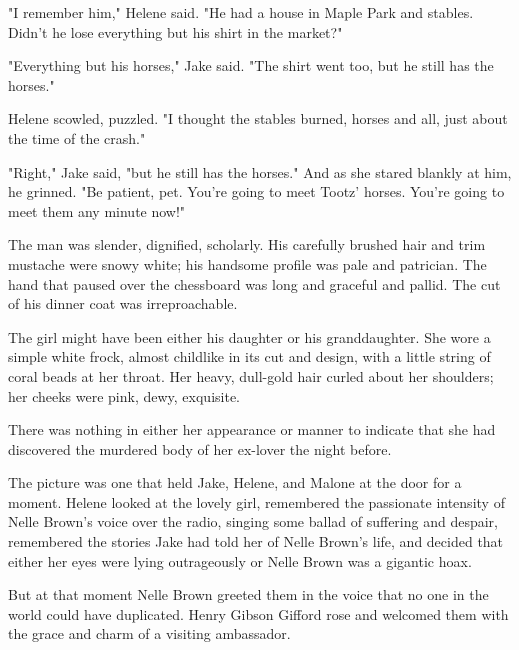 \documentclass{novel}
\begin{document}
"I remember him," Helene said. "He had a house in Maple Park and stables. Didn’t he lose everything but his shirt in the market?"

"Everything but his horses," Jake said. "The shirt went too, but he still has the horses."

Helene scowled, puzzled. "I thought the stables burned, horses and all, just about the time of the crash."

"Right," Jake said, "but he still has the horses." And as she stared blankly at him, he grinned. "Be patient, pet. You’re going to meet Tootz’ horses. You’re going to meet them any minute now!"

\begin{ChapterStart}
\vspace{3\nbs}
\end{ChapterStart}

The man was slender, dignified, scholarly. His carefully brushed hair and trim mustache were snowy white; his handsome profile was pale and patrician. The hand that paused over the chessboard was long and graceful and pallid. The cut of his dinner coat was irreproachable.

The girl might have been either his daughter or his granddaughter. She wore a simple white frock, almost childlike in its cut and design, with a little string of coral beads at her throat. Her heavy, dull-gold hair curled about her shoulders; her cheeks were pink, dewy, exquisite.

There was nothing in either her appearance or manner to indicate that she had discovered the murdered body of her ex-lover the night before.

The picture was one that held Jake, Helene, and Malone at the door for a moment. Helene looked at the lovely girl, remembered the passionate intensity of Nelle Brown’s voice over the radio, singing some ballad of suffering and despair, remembered the stories Jake had told her of Nelle Brown’s life, and decided that either her eyes were lying outrageously or Nelle Brown was a gigantic hoax.

But at that moment Nelle Brown greeted them in the voice that no one in the world could have duplicated. Henry Gibson Gifford rose and welcomed them with the grace and charm of a visiting ambassador.
\end{document}
